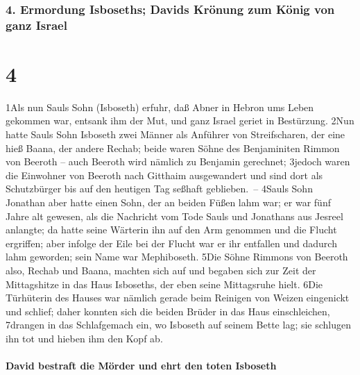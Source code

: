 \hypertarget{ermordung-isboseths-davids-kruxf6nung-zum-kuxf6nig-von-ganz-israel}{%
\subsubsection{4. Ermordung Isboseths; Davids Krönung zum König von ganz
Israel}\label{ermordung-isboseths-davids-kruxf6nung-zum-kuxf6nig-von-ganz-israel}}

\hypertarget{section-3}{%
\section{4}\label{section-3}}

1Als nun Sauls Sohn (Isboseth) erfuhr, daß Abner in Hebron ums Leben
gekommen war, entsank ihm der Mut, und ganz Israel geriet in Bestürzung.
2Nun hatte Sauls Sohn Isboseth zwei Männer als Anführer von
Streifscharen, der eine hieß Baana, der andere Rechab; beide waren Söhne
des Benjaminiten Rimmon von Beeroth -- auch Beeroth wird nämlich zu
Benjamin gerechnet; 3jedoch waren die Einwohner von Beeroth nach
Gitthaim ausgewandert und sind dort als Schutzbürger bis auf den
heutigen Tag seßhaft geblieben.~-- 4Sauls Sohn Jonathan aber hatte einen
Sohn, der an beiden Füßen lahm war; er war fünf Jahre alt gewesen, als
die Nachricht vom Tode Sauls und Jonathans aus Jesreel anlangte; da
hatte seine Wärterin ihn auf den Arm genommen und die Flucht ergriffen;
aber infolge der Eile bei der Flucht war er ihr entfallen und dadurch
lahm geworden; sein Name war Mephiboseth. 5Die Söhne Rimmons von Beeroth
also, Rechab und Baana, machten sich auf und begaben sich zur Zeit der
Mittagshitze in das Haus Isboseths, der eben seine Mittagsruhe hielt.
6Die Türhüterin des Hauses war nämlich gerade beim Reinigen von Weizen
eingenickt und schlief; daher konnten sich die beiden Brüder in das Haus
einschleichen, 7drangen in das Schlafgemach ein, wo Isboseth auf seinem
Bette lag; sie schlugen ihn tot und hieben ihm den Kopf ab.

\hypertarget{david-bestraft-die-muxf6rder-und-ehrt-den-toten-isboseth}{%
\paragraph{David bestraft die Mörder und ehrt den toten
Isboseth}\label{david-bestraft-die-muxf6rder-und-ehrt-den-toten-isboseth}}


